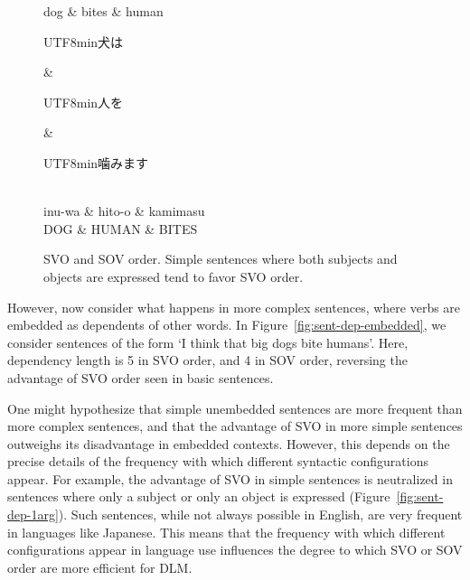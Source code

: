 \documentclass[11pt,a4paper]{article}
\newcommand{\japanese}[1]{\begin{CJK}{UTF8}{min}#1\end{CJK}}
\begin{document}
\begin{figure}[ht]
\begin{dependency}[theme = simple]
   \begin{deptext}[column sep=1em]
          dog \& bites \& human  \\
   \end{deptext}
\end{dependency}
\begin{dependency}[theme = simple]
   \begin{deptext}[column sep=1em]
   \japanese{犬は} \& \japanese{人を} \& \japanese{噛みます}\\ 
   inu-wa \& hito-o \& kamimasu \\
          DOG \& HUMAN \& BITES  \\
   \end{deptext}
\end{dependency}
        \caption{SVO and SOV order. Simple sentences where both subjects and objects are expressed tend to favor SVO order.}
        \label{fig:sent-dep}
\end{figure}

However, now consider what happens in more complex sentences, where verbs are embedded as dependents of other words.
In Figure~\ref{fig:sent-dep-embedded}, we consider sentences of the form `I think that big dogs bite humans'.
Here, dependency length is 5 in SVO order, and 4 in SOV order, reversing the advantage  of SVO order seen in basic sentences.

One might hypothesize that simple unembedded sentences are more frequent than more complex sentences, and that the advantage of SVO in more simple sentences outweighs its disadvantage in embedded contexts.
However, this depends on the precise details of the frequency with which different syntactic configurations appear.
For example, the advantage of SVO in simple sentences is neutralized in sentences where only a subject or only an object is expressed (Figure~\ref{fig:sent-dep-1arg}).
Such sentences, while not always possible in English, are very frequent in languages like Japanese.
This means that the frequency with which different configurations appear in language use influences the degree to which SVO or SOV order are more efficient for DLM.
\end{document}

